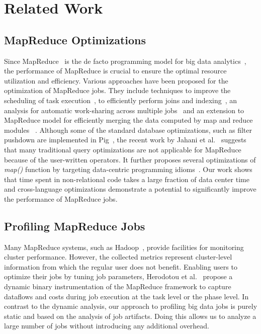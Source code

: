 \section{Related Work}

\subsection{MapReduce Optimizations}
Since MapReduce~\cite{Dean:2008} is the de facto programming model for big data analytics~\cite{Gates:2009}, the performance of MapReduce is crucial to ensure the optimal resource utilization and efficiency.
Various approaches have been proposed for the optimization of MapReduce jobs.
They include techniques to improve the scheduling of task execution~\cite{Isard:2009,Zaharia:2008}, to efficiently perform joins and indexing~\cite{Dittrich:2010,Floratou:2011}, an analysis for automatic work-sharing across multiple jobs~\cite{Nykiel:2010} and an extension to MapReduce model for efficiently merging the data computed by map and reduce modules~\cite{Yang:2007} . Although some of the standard database optimizations, such as filter pushdown are implemented in Pig~\cite{Olston:2008}, the recent work by Jahani et al.~\cite{Jahani:2011} suggests that many traditional query optimizations are not applicable for MapReduce because of the user-written operators. It further proposes several optimizations of \emph{map()} function by targeting data-centric programming idioms~\cite{Jahani:2011}. Our work shows that time spent in non-relational code takes a large fraction of data center time and cross-language optimizations demonstrate a potential to significantly improve the performance of MapReduce jobs.

\subsection{Profiling MapReduce Jobs}
Many MapReduce systems, such as Hadoop~\cite{hadoop_stream}, provide facilities for monitoring cluster performance.
However, the collected metrics represent cluster-level information from which the regular user does not benefit.
Enabling users to optimize their jobs by tuning job parameters, Herodotou et al.~\cite{Herodotou} propose a dynamic binary instrumentation of the MapReduce framework to capture dataflows and costs during job execution at the task level or the phase level.
In contrast to the dynamic analysis, our approach to profiling big data jobs is purely static and based on the analysis of job artifacts. Doing this allows us to analyze a large number of jobs without introducing any additional overhead. 

